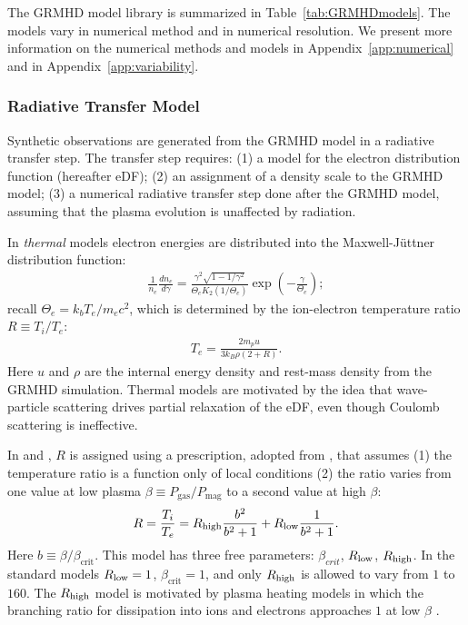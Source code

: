 The GRMHD model library is summarized in Table~\ref{tab:GRMHDmodels}. The models vary in numerical method and in numerical resolution. We present more information on the numerical methods and models in Appendix~\ref{app:numerical} and in  Appendix~\ref{app:variability}.

\subsubsection{Radiative Transfer Model}

Synthetic observations are generated from the GRMHD model in a radiative transfer step.  The transfer step requires: (1) a model for the electron distribution function (hereafter eDF); (2) an assignment of a density scale to the GRMHD model; (3) a numerical radiative transfer step done after the GRMHD model, assuming that the plasma evolution is unaffected by radiation.


In {\it thermal} models electron energies are distributed into the Maxwell-J{\"u}ttner distribution function:
\begin{align}
\frac{1}{n_e}\frac{dn_e}{d\gamma}= \frac{\gamma^2 \sqrt{1-1/\gamma^2}} {\Theta_e K_2(1/\Theta_e)} \exp\left(-\frac{\gamma}{\Theta_e}\right);
\end{align}
recall $\Theta_e=k_b T_e/m_e c^2$, which is determined by the ion-electron temperature ratio $R \equiv T_i/T_e$:
\begin{align}
T_e=\frac{2 m_p u}{3 k_B \rho (2+R)}.
\end{align}
Here $u$ and $\rho$ are the internal energy density and rest-mass density from the GRMHD simulation.  Thermal models are motivated by the idea that wave-particle scattering drives partial relaxation of the eDF, even though Coulomb scattering is ineffective.

In  and , $R$ is assigned using a prescription, adopted from \cite{2016A&A...586A..38M}, that assumes (1) the temperature ratio is a function only of local conditions (2) the ratio varies from one value at low plasma $\beta \equiv P_\mathrm{gas}/P_\mathrm{mag}$ to a second value at high $\beta$:
\begin{equation}
R = \frac{T_i}{T_e} = \Rh \frac{b^2}{b^2+1} + \Rl \frac{1}{b^2+1}.
\end{equation}
Here $b \equiv \beta/\beta_\mathrm{crit}$. This model has three free parameters: $\beta_{crit}$, $R_\mathrm{low}$, $R_\mathrm{high}$.  In the standard models $R_\mathrm{low} = 1$, $\beta_\mathrm{crit} = 1$, and only $R_\mathrm{high}$ is allowed to vary from $1$ to $160$.  The $R_\mathrm{high}$ model is motivated by plasma heating models in which the branching ratio for dissipation into ions and electrons approaches $1$ at low $\beta$ \citep[e.g.,][]{2010MNRAS.409L.104H,Kawazura771}.

